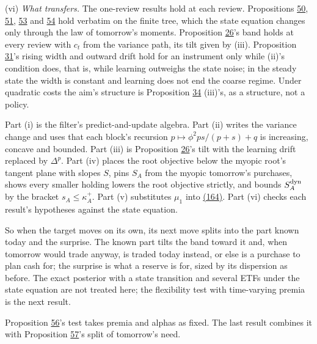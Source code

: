 \documentclass[11pt]{article}
\begin{document}
(vi) \emph{What transfers.} The one-review results hold at each review.
Propositions \hyperref[res:Proposition-50]{50}, \hyperref[res:Proposition-51]{51}, \hyperref[res:Proposition-53]{53} and \hyperref[res:Proposition-54]{54} hold verbatim on the finite tree, which
the state equation changes only through the law of tomorrow's moments.
Proposition \hyperref[res:Proposition-26]{26}'s band holds at every review with \(c_t\) from the variance
path, its tilt given by (iii). Proposition \hyperref[res:Proposition-31]{31}'s rising width and outward
drift hold for an instrument only while (ii)'s condition does, that is,
while learning outweighs the state noise; in the steady state the width
is constant and learning does not end the coarse regime. Under
quadratic costs the aim's structure is Proposition \hyperref[res:Proposition-34]{34} (iii)'s, as a
structure, not a policy.

Part (i) is the filter's predict-and-update algebra. Part (ii) writes
the variance change and uses that each block's recursion
\(p\mapsto\phi^2ps/(p+s)+q\) is increasing, concave and bounded. Part (iii) is
Proposition \hyperref[res:Proposition-26]{26}'s tilt with the learning drift replaced by \(\Delta^p\). Part (iv)
places the root objective below the myopic root's tangent plane with
slopes \(S\), pins \(S_A\) from the myopic tomorrow's purchases, shows every
smaller holding lowers the root objective strictly, and bounds \(S^{\rm dyn}_A\) by
the bracket \(s_A\leq\kappa^+_A\). Part (v) substitutes \(\mu_1\) into \hyperref[eq:164]{(164)}. Part (vi)
checks each result's hypotheses against the state equation.

So when the target moves on its own, its next move splits into the
part known today and the surprise. The known part tilts the band
toward it and, when tomorrow would trade anyway, is traded today
instead, or else is a purchase to plan cash for; the surprise is what
a reserve is for, sized by its dispersion as before. The exact
posterior with a state transition and several ETFs under the state
equation are not treated here; the flexibility test with time-varying
premia is the next result.

Proposition \hyperref[res:Proposition-56]{56}'s test takes premia and alphas as fixed. The last
result combines it with Proposition \hyperref[res:Proposition-57]{57}'s split of tomorrow's need.
\end{document}
